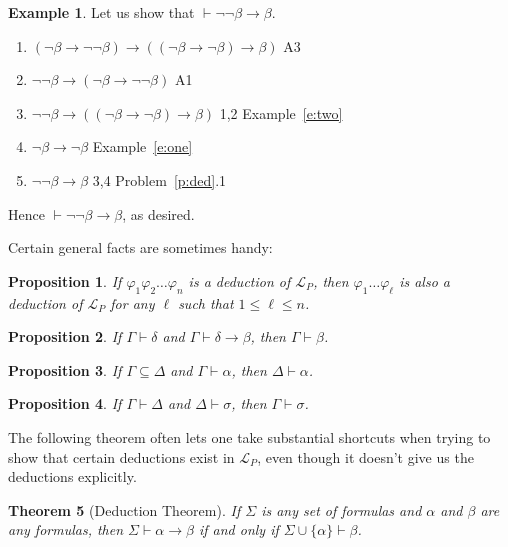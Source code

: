 \documentclass[12pt]{amsbook}
\newcommand{\proves}{\vdash}
\theoremstyle{plain}
\newtheorem{thm}{Theorem}[chapter]
\newtheorem{prop}[thm]{Proposition}
\theoremstyle{definition}
\newtheorem{exmp}{Example}[chapter]
\theoremstyle{remark}
\begin{document}
\begin{exmp} \label{e:four}
Let us show that $\proves \lnot\lnot \beta \to \beta$.
\begin{enumerate}
\item $(\lnot\beta \to \lnot\lnot\beta) \to ((\lnot\beta \to \lnot\beta) \to \beta)$ \hfill A3
\item $\lnot\lnot\beta \to (\lnot\beta \to \lnot\lnot\beta)$ \hfill A1
\item $\lnot\lnot\beta \to ((\lnot\beta \to \lnot\beta) \to \beta)$
\hfill 1,2 Example~\ref{e:two}
\item $\lnot\beta \to \lnot\beta$ \hfill Example~\ref{e:one}
\item $\lnot\lnot \beta \to \beta$ \hfill 3,4 Problem~\ref{p:ded}.1
\end{enumerate}
Hence $\proves \lnot\lnot \beta \to \beta$,  as desired.
\end{exmp}


Certain general facts are sometimes handy:

\begin{prop} \label{p:three3a}
If $\varphi_1 \varphi_2 \dots \varphi_n$ is a deduction of $\mathcal{L}_P$,  then $\varphi_1  \dots \varphi_\ell$ is also a deduction of $\mathcal{L}_P$ for any $\ell$ such that $1 \le \ell \le n$.
\end{prop}

\begin{prop} \label{p:dmp}
If $\Gamma \proves \delta$ and $\Gamma \proves \delta \to \beta$,  then $\Gamma \proves \beta$.
\end{prop}

\begin{prop} \label{p:three5}
If $\Gamma \subseteq \Delta$ and $\Gamma \proves \alpha$,  then $\Delta \proves \alpha$.
\end{prop}

\begin{prop} \label{p:three6}
If $\Gamma \proves \Delta$ and $\Delta \proves \sigma$,  then $\Gamma \proves \sigma$.
\end{prop}


The following theorem often lets one take substantial shortcuts when trying to show that certain deductions exist in $\mathcal{L}_P$,  even though it doesn't give us the deductions explicitly.  

\begin{thm}[Deduction Theorem] \label{t:ded} 
If $\Sigma$ is any set of formulas and $\alpha$ and $\beta$ are any formulas,  then $\Sigma \proves \alpha \to \beta$ if and only if $\Sigma \cup \{ \alpha \} \proves \beta$.
\end{thm}
\end{document}
